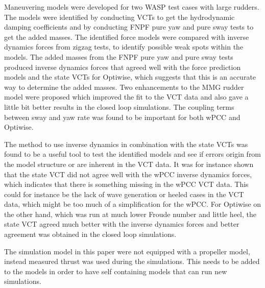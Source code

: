 %
\noindent Maneuvering models were developed for two WASP test cases with large rudders. The models were identified by conducting VCTs to get the hydrodynamic damping coefficients and by conducting FNPF pure yaw and pure sway tests to get the added masses. The identified force models were compared with inverse dynamics forces from zigzag tests, to identify possible weak spots within the models.  
The added masses from the FNPF pure yaw and pure sway tests produced inverse dynamics forces that agreed well with the force prediction models and the state VCTs for Optiwise, which suggests that this is an accurate way to determine the added masses.
Two enhancements to the MMG rudder model were proposed which improved the fit to the VCT data and also gave a little bit better results in the closed loop simulations.
The coupling terms between sway and yaw rate was found to be important for both wPCC and Optiwise.

The method to use inverse dynamics in combination with the state VCTs was found to be a useful tool to test the identified models and see if errors origin from the model structure or are inherent in the VCT data.
It was for instance shown that the state VCT did not agree well with the wPCC inverse dynamics forces, which indicates that there is something missing in the wPCC VCT data. This could for instance be the lack of wave generation or heeled cases in the VCT data, which might be too much of a simplification for the wPCC.
For Optiwise on the other hand, which was run at much lower Froude number and little heel, the state VCT agreed much better with the inverse dynamics forces and better agreement was obtained in the closed loop simulations.

The simulation model in this paper were not equipped with a propeller model, instead measured thrust was used during the simulations. This needs to be added to the models in order to have self containing models that can run new simulations. 
